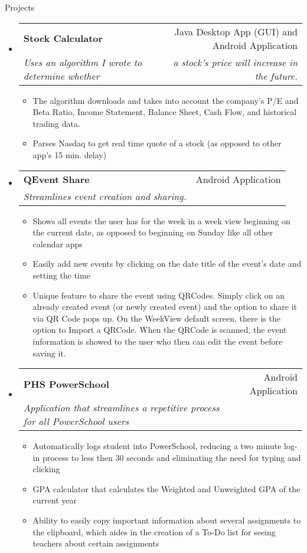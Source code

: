 \documentclass[letterpaper,11pt]{article}
\makeatletter
\newcommand{\resitem}[1]{\item #1 \vspace{-2pt}}
\newcommand{\resheading}[1]{{\large \parashade[.9]{sharpcorners}{\textbf{#1 \vphantom{p\^{E}}}}}}
\newcommand{\ressubheading}[4]{
\begin{tabular*}{6.5in}{l@{\extracolsep{\fill}}r}
		\textbf{#1} & #2 \\
		\textit{#3} & \textit{#4} \\
\end{tabular*}\vspace{-6pt}}
\makeatother
\begin{document}
\begin{description} \item[Projects] \end{description}
\begin{itemize}

\item
	\ressubheading{Stock Calculator}{Java Desktop App (GUI) and Android Application}{Uses an algorithm I wrote to determine whether}{a stock's price will increase in the future.\space\space\space\space\space\space\space\space\space}
	\begin{itemize}
		\resitem{The algorithm downloads and takes into account the company’s P/E and Beta Ratio, Income Statement, Balance Sheet, Cash Flow, and historical trading data.}
		\resitem{Parses Nasdaq to get real time quote of a stock (as opposed to other app's 15 min. delay)}
	\end{itemize}


\item
	\ressubheading{QEvent Share}{Android Application}{Streamlines event creation and sharing.}{}
	\begin{itemize}
		\resitem{Shows all events the user has for the week in a week view beginning on the current date, as opposed to beginning on Sunday like all other calendar apps}
		\resitem{Easily add new events by clicking on the date title of the event’s date and setting the time}
		\resitem{Unique feature to share the event using QRCodes. Simply click on an already created event (or newly created event) and the option to share it via QR Code pops up. On the WeekView default screen, there is the option to Import a QRCode. When the QRCode is scanned, the event information is showed to the user who then can edit the event before saving it.}
	\end{itemize}

\item
	\ressubheading{PHS PowerSchool}{Android Application}{Application that streamlines a repetitive process for all PowerSchool users}{}
	\begin{itemize}
		\resitem{Automatically logs student into PowerSchool, reducing a two minute log-in process to less then 30 seconds and eliminating the need for typing and clicking}
		\resitem{GPA calculator that calculates the Weighted and Unweighted GPA of the current year}
		\resitem{Ability to easily copy important information about several assignments to the clipboard, which aides in the creation of a To-Do list for seeing teachers about certain assignments}
	\end{itemize}
\end{itemize}
\end{document}
